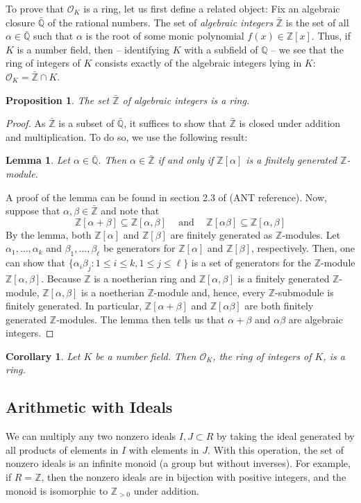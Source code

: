 \documentclass{book}
\theoremstyle{plain}
\newtheorem{proposition}[theorem]{Proposition}
\newtheorem{corollary}[theorem]{Corollary}
\newtheorem{lemma}[theorem]{Lemma}
\theoremstyle{definition}
\numberwithin{equation}{section}
\numberwithin{figure}{section}
\numberwithin{table}{section}
\newcommand{\Q}{\mathbb{Q}}
\newcommand{\Z}{\mathbb{Z}}
\renewcommand{\O}{\mathcal{O}}
\begin{document}
To prove that $\O_K$ is a ring, let us first define a related object:  Fix an algebraic closure $\bar{\Q}$ of the rational numbers.  The set of \textit{algebraic integers} $\bar{\Z}$ is the set of all $\alpha \in \bar{\Q}$ such that $\alpha$ is the root of some monic polynomial $f(x) \in \Z[x]$.  Thus, if $K$ is a number field, then -- identifying $K$ with a subfield of $\Q$ -- we see that the ring of integers of $K$ consists exactly of the algebraic integers lying in $K$: $\O_K = \bar{\Z} \cap K$.
\begin{proposition}
The set $\bar{\Z}$ of algebraic integers is a ring.
\end{proposition}
\begin{proof}
As $\bar{\Z}$ is a subset of $\bar{\Q}$, it suffices to show that $\bar{\Z}$ is closed under addition and multiplication.  To do so, we use the following result:
\begin{lemma}
Let $\alpha \in \bar{\Q}$.  Then $\alpha \in \bar{\Z}$ if and only if $\Z[\alpha]$ is a finitely generated $\Z$-module.
\end{lemma}
A proof of the lemma can be found in section 2.3 of (ANT reference).  Now, suppose that $\alpha, \beta \in \bar{\Z}$ and note that
$$
\Z[\alpha + \beta] \subseteq \Z[\alpha, \beta] \hspace{15pt} \text{and} \hspace{15pt} \Z[\alpha\beta] \subseteq \Z[\alpha, \beta]
$$
By the lemma, both $\Z[\alpha]$ and $\Z[\beta]$ are finitely generated as $\Z$-modules.  Let $\alpha_1, \ldots, \alpha_k$ and $\beta_1, \ldots, \beta_\ell$ be generators for $\Z[\alpha]$ and $\Z[\beta]$, respectively.  Then, one can show that $\{\alpha_i \beta_j: 1 \leq i \leq k, 1 \leq j \leq \ell\}$ is a set of generators for the $\Z$-module $\Z[\alpha, \beta]$.  Because $\Z$ is a noetherian ring and $\Z[\alpha, \beta]$ is a finitely generated $\Z$-module, $\Z[\alpha,\beta]$ is a noetherian $\Z$-module and, hence, every $\Z$-submodule is finitely generated.  In particular, $\Z[\alpha + \beta]$ and $\Z[\alpha \beta]$ are both finitely generated $\Z$-modules.  The lemma then tells us that $\alpha + \beta$ and $\alpha \beta$ are algebraic integers.
\end{proof}
\begin{corollary}
Let $K$ be a number field.  Then $\O_K$, the ring of integers of $K$, is a ring.
\end{corollary}


\subsection{Arithmetic with Ideals}
We can multiply any two nonzero ideals $I, J\subset R$ by taking
the ideal generated by all products of elements in $I$ with elements
in $J$.  With this operation, the set of nonzero ideals is an infinite
monoid (a group but without inverses).
For example, if $R=\Z$, then the nonzero ideals are in
bijection with positive integers, and the monoid is isomorphic to
$\Z_{>0}$ under addition.
\end{document}
